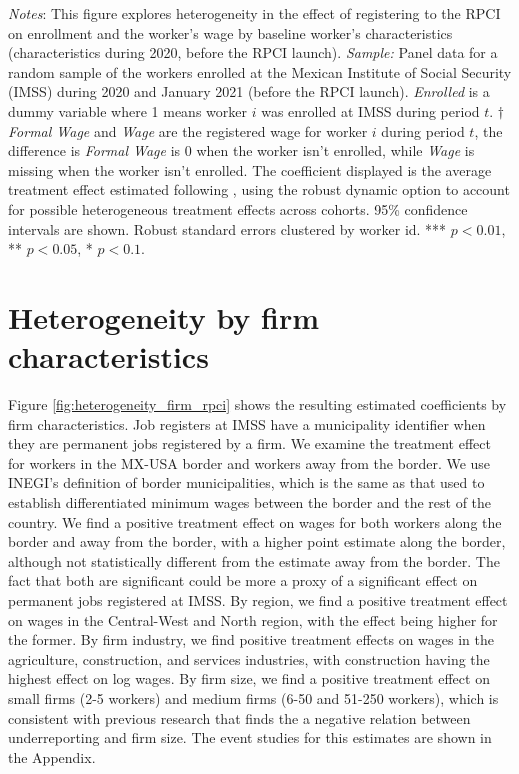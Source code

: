 \documentclass[10pt, oneside]{book}
\begin{document}
\scriptsize{
\noindent \textit{Notes}: This figure explores heterogeneity in the effect of registering to the RPCI on enrollment and the worker's wage by baseline worker's characteristics (characteristics during 2020, before the RPCI launch). \textit{Sample:} Panel data for a random sample of the workers enrolled at the Mexican Institute of Social Security (IMSS) during 2020 and January 2021 (before the RPCI launch). \textit{Enrolled} is a dummy variable where 1 means worker $i$ was enrolled at IMSS during period $t$. $\dagger$ \textit{Formal Wage} and \textit{Wage} are the registered wage for worker $i$ during period $t$, the difference is \textit{Formal Wage} is 0 when the worker isn't enrolled, while \textit{Wage} is missing when the worker isn't enrolled. The coefficient displayed is the average treatment effect estimated following \cite{de2020two}, using the robust dynamic option to account for possible heterogeneous treatment effects across cohorts. 95\% confidence intervals are shown. Robust standard errors clustered by worker id. *** $p<0.01$, ** $p<0.05$, * $p<0.1$. %
} \\

\normalsize

\section{Heterogeneity by firm characteristics}

Figure \ref{fig:heterogeneity_firm_rpci} shows the resulting estimated coefficients by firm characteristics. Job registers at IMSS have a municipality identifier when they are permanent jobs registered by a firm. We examine the treatment effect for workers in the MX-USA border and workers away from the border. We use INEGI's definition of border municipalities, which is the same as that used to establish differentiated minimum wages between the border and the rest of the country. We find a positive treatment effect on wages for both workers along the border and away from the border, with a higher point estimate along the border, although not statistically different from the estimate away from the border. The fact that both are significant could be more a proxy of a significant effect on permanent jobs registered at IMSS. By region, we find a positive treatment effect on wages in the Central-West and North region, with the effect being higher for the former. By firm industry, we find positive treatment effects on wages in the agriculture, construction, and services industries, with construction having the highest effect on log wages. By firm size, we find a positive treatment effect on small firms (2-5 workers) and medium firms (6-50 and 51-250 workers), which is consistent with previous research that finds the a negative relation between underreporting and firm size. The event studies for this estimates are shown in the Appendix. \\
\end{document}
